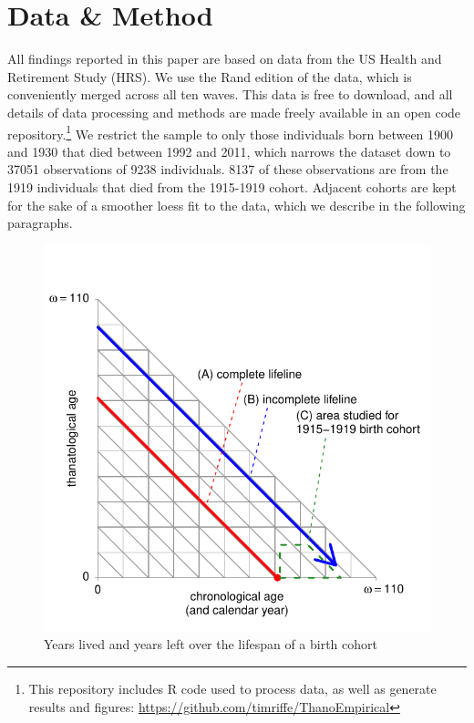 \documentclass[11pt,oneside]{article} %
\begin{document}
\section*{Data \& Method}

All findings reported in this paper are based on data from the US Health and
Retirement Study (HRS). We use the Rand edition of the data, which is
conveniently merged across all ten waves. This data is free to download,
and all details of data processing and methods are made freely available in an open code
repository.\footnote{This
repository includes R code used to process data, as well as generate results and
figures: \url{https://github.com/timriffe/ThanoEmpirical}}
We restrict the sample to only those
individuals born between 1900 and 1930 that died between 1992 and 2011, which narrows the dataset down to 37051 observations of 9238 individuals. 8137 of these observations are from the 1919 individuals that died from the 1915-1919 cohort. Adjacent cohorts are kept for the sake of a smoother loess fit to the data, which we describe in the following paragraphs.
%
\begin{figure}[!h]
\centering
\caption{Years lived and years left over the lifespan of a birth cohort}
\label{fig:LexisOrtho}
	\includegraphics{Figures/LexisOrtho.pdf}
\end{figure}
\end{document}
